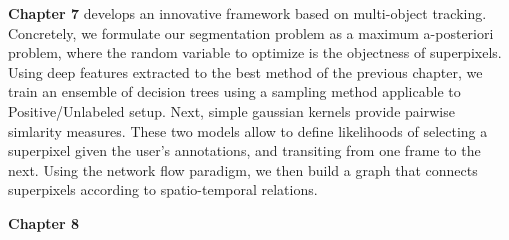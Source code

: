 \textbf{Chapter 7} develops an innovative framework based on multi-object tracking.
Concretely, we formulate our segmentation problem as a maximum a-posteriori problem, where the random variable to optimize is the objectness of superpixels.
Using deep features extracted to the best method of the previous chapter, we train an ensemble of decision trees using a sampling method applicable to Positive/Unlabeled setup.
Next, simple gaussian kernels provide pairwise simlarity measures.
These two models allow to define likelihoods of selecting a superpixel given the user's annotations, and transiting from one frame to the next.
Using the network flow paradigm, we then build a graph that connects superpixels according to spatio-temporal relations.

\textbf{Chapter 8}





